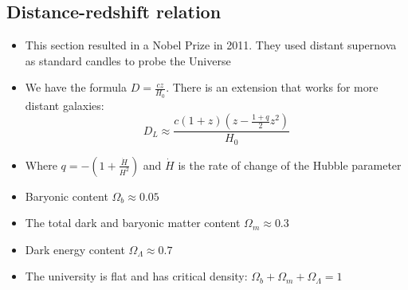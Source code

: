 \documentclass{article}
\begin{document}
\subsection{Distance-redshift relation}
\begin{itemize}
\item This section resulted in a Nobel Prize in 2011. They used distant supernova as standard candles to probe the Universe
\item We have the formula $D=\frac{cz}{H_0}$. There is an extension that works for more distant galaxies:
\begin{equation}
D_L \approx \frac{c(1+z)(z-\frac{1+q}{2}z^2)}{H_0}
\end{equation}
\item Where $q=-\left(1+\frac{\dot{H}}{H^2}\right)$ and $\dot{H}$ is the rate of change of the Hubble parameter
\end{itemize}
\begin{itemize}
\item Baryonic content  $\Omega_b \approx 0.05$
\item The total dark and baryonic matter content $\Omega_m \approx 0.3$
\item Dark energy content $\Omega_\Lambda \approx 0.7$
\item The university is flat and has critical density:  $\Omega_b+\Omega_m+\Omega_\Lambda=1$
\end{itemize}
\end{document}
